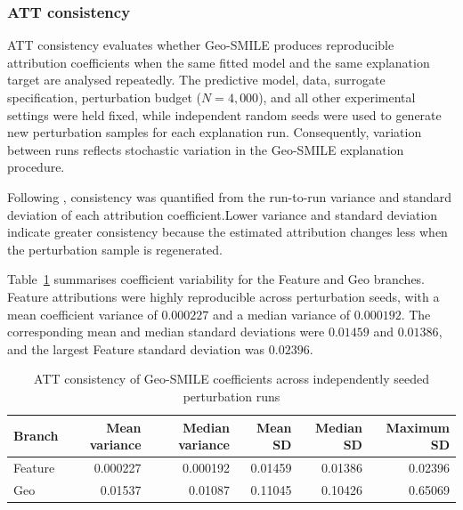 \subsubsection{ATT consistency}
\label{sec:hull_att_consistency}

ATT consistency evaluates whether Geo-SMILE produces reproducible attribution coefficients when the same fitted model and the same explanation target are analysed repeatedly. The predictive model, data, surrogate specification, perturbation budget ($N=4{,}000$), and all other experimental settings were held fixed, while independent random seeds were used to generate new perturbation samples for each explanation run. Consequently, variation between runs reflects stochastic variation in the Geo-SMILE explanation procedure.

Following \citet{dehghani_smile_thesis}, consistency was quantified from the run-to-run variance and standard deviation of each attribution coefficient.Lower variance and standard deviation indicate greater consistency because the estimated attribution changes less when the perturbation sample is regenerated.






Table~\ref{tab:hull_consistency_variance} summarises coefficient variability for the Feature and Geo branches. Feature attributions were highly reproducible across perturbation seeds, with a mean coefficient variance of $0.000227$ and a median variance of $0.000192$. The corresponding mean and median standard deviations were $0.01459$ and $0.01386$, and the largest Feature standard deviation was $0.02396$.

\begin{table}[H]
\centering
\caption{ATT consistency of Geo-SMILE coefficients across independently
seeded perturbation runs}
\label{tab:hull_consistency_variance}
\small
\begin{tabular}{l|rrrrr}
\toprule
Branch &
Mean variance &
Median variance &
Mean SD &
Median SD &
Maximum SD \\
\midrule
Feature &
0.000227 &
0.000192 &
0.01459 &
0.01386 &
0.02396 \\
Geo &
0.01537 &
0.01087 &
0.11045 &
0.10426 &
0.65069 \\
\bottomrule
\end{tabular}
\end{table}

